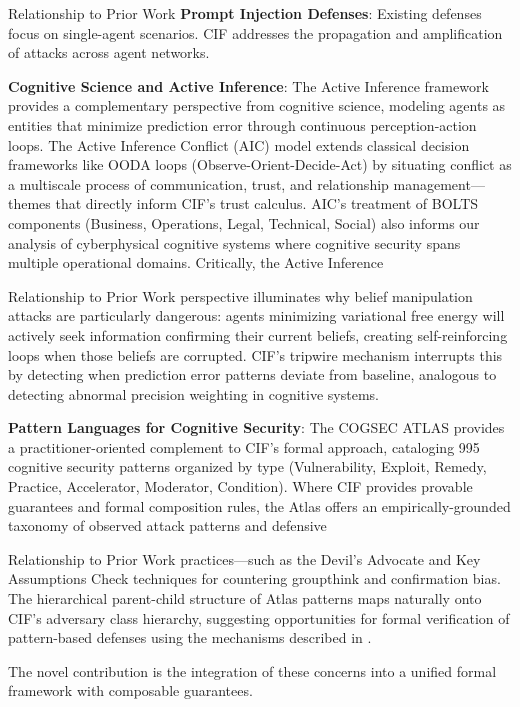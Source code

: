 \documentclass[
  ignorenonframetext,
]{beamer}
\providecommand{\cref}[1]{\texttt{\detokenize{#1}}}
\begin{document}
\begin{frame}[allowframebreaks]{Relationship to Prior Work}
\textbf{Prompt Injection Defenses}: Existing defenses focus on
single-agent scenarios. CIF addresses the propagation and amplification
of attacks across agent networks.

\textbf{Cognitive Science and Active Inference}: The Active Inference
framework \cite{david2021aic} provides a complementary perspective from
cognitive science, modeling agents as entities that minimize prediction
error through continuous perception-action loops. The Active Inference
Conflict (AIC) model extends classical decision frameworks like OODA
loops (Observe-Orient-Decide-Act) by situating conflict as a multiscale
process of communication, trust, and relationship management---themes
that directly inform CIF's trust calculus. AIC's treatment of BOLTS
components (Business, Operations, Legal, Technical, Social) also informs
our analysis of cyberphysical cognitive systems where cognitive security
spans multiple operational domains. Critically, the Active Inference
\end{frame}

\begin{frame}[allowframebreaks]{Relationship to Prior Work}
perspective illuminates why belief manipulation attacks are particularly
dangerous: agents minimizing variational free energy will actively seek
information confirming their current beliefs, creating self-reinforcing
loops when those beliefs are corrupted. CIF's tripwire mechanism
interrupts this by detecting when prediction error patterns deviate from
baseline, analogous to detecting abnormal precision weighting in
cognitive systems.

\textbf{Pattern Languages for Cognitive Security}: The COGSEC ATLAS
\cite{cogsecatlas2023} provides a practitioner-oriented complement to
CIF's formal approach, cataloging 995 cognitive security patterns
organized by type (Vulnerability, Exploit, Remedy, Practice,
Accelerator, Moderator, Condition). Where CIF provides provable
guarantees and formal composition rules, the Atlas offers an
empirically-grounded taxonomy of observed attack patterns and defensive
\end{frame}

\begin{frame}[allowframebreaks]{Relationship to Prior Work}
practices---such as the Devil's Advocate and Key Assumptions Check
techniques for countering groupthink and confirmation bias. The
hierarchical parent-child structure of Atlas patterns maps naturally
onto CIF's adversary class hierarchy, suggesting opportunities for
formal verification of pattern-based defenses using the mechanisms
described in \cref{sec:defense-mechanisms}.

The novel contribution is the integration of these concerns into a
unified formal framework with composable guarantees.
\end{frame}
\end{document}
